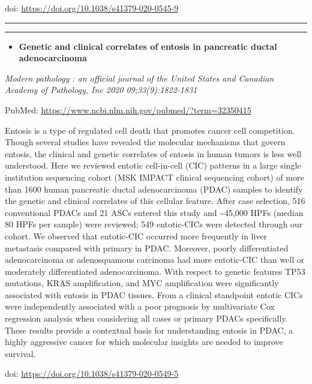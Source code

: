 \documentclass[
]{article}
\providecommand{\tightlist}{%
  \setlength{\itemsep}{0pt}\setlength{\parskip}{0pt}}
\begin{document}
doi: \url{https://doi.org/10.1038/s41379-020-0545-9}

\begin{center}\rule{0.5\linewidth}{0.5pt}\end{center}

\begin{center}\rule{0.5\linewidth}{0.5pt}\end{center}

\begin{itemize}
\tightlist
\item
  \textbf{Genetic and clinical correlates of entosis in pancreatic
  ductal adenocarcinoma}
\end{itemize}

\emph{Modern pathology : an official journal of the United States and
Canadian Academy of Pathology, Inc 2020 09;33(9):1822-1831}

PubMed: \url{https://www.ncbi.nlm.nih.gov/pubmed/?term=32350415}

Entosis is a type of regulated cell death that promotes cancer cell
competition. Though several studies have revealed the molecular
mechanisms that govern entosis, the clinical and genetic correlates of
entosis in human tumors is less well understood. Here we reviewed
entotic cell-in-cell (CIC) patterns in a large single institution
sequencing cohort (MSK IMPACT clinical sequencing cohort) of more than
1600 human pancreatic ductal adenocarcinoma (PDAC) samples to identify
the genetic and clinical correlates of this cellular feature. After case
selection, 516 conventional PDACs and 21 ASCs entered this study and
\textasciitilde45,000 HPFs (median 80 HPFs per sample) were reviewed;
549 entotic-CICs were detected through our cohort. We observed that
entotic-CIC occurred more frequently in liver metastasis compared with
primary in PDAC. Moreover, poorly differentiated adenocarcinoma or
adenosquamous carcinoma had more entotic-CIC than well or moderately
differentiated adenocarcinoma. With respect to genetic features TP53
mutations, KRAS amplification, and MYC amplification were significantly
associated with entosis in PDAC tissues. From a clinical standpoint
entotic CICs were independently associated with a poor prognosis by
multivariate Cox regression analysis when considering all cases or
primary PDACs specifically. These results provide a contextual basis for
understanding entosis in PDAC, a highly aggressive cancer for which
molecular insights are needed to improve survival.

doi: \url{https://doi.org/10.1038/s41379-020-0549-5}
\end{document}
